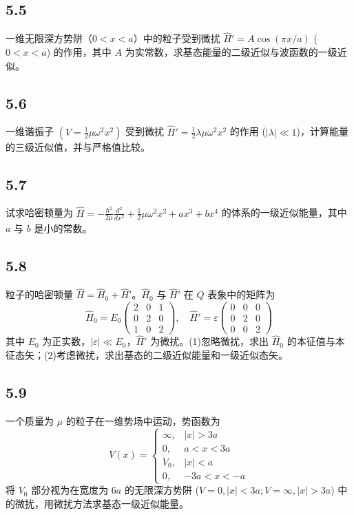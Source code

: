 \subsection{5.5}
一维无限深方势阱（$0 < x < a$）中的粒子受到微扰 $\hat{H}' = A \cos(\pi x / a)$ ($0 < x < a$) 的作用，其中 $A$ 为实常数，求基态能量的二级近似与波函数的一级近似。

\subsection{5.6}
一维谐振子 $\left( V = \frac{1}{2} \mu \omega^{2} x^{2} \right)$ 受到微扰 $\hat{H}' = \frac{1}{2} \lambda \mu \omega^{2} x^{2}$ 的作用 ($|\lambda| \ll 1$)，计算能量的三级近似值，并与严格值比较。

\subsection{5.7}
试求哈密顿量为 $\hat{H} = -\frac{\hbar^2}{2\mu} \frac{d^2}{dx^2} + \frac{1}{2} \mu \omega^2 x^2 + ax^3 + bx^4$ 的体系的一级近似能量，其中 $a$ 与 $b$ 是小的常数。

\subsection{5.8}
粒子的哈密顿量 $\hat{H} = \hat{H}_0 + \hat{H}'$。$\hat{H}_0$ 与 $\hat{H}'$ 在 $Q$ 表象中的矩阵为
$$\hat{H}_0 = E_0 \begin{pmatrix} 2 & 0 & 1 \\ 0 & 2 & 0 \\ 1 & 0 & 2 \end{pmatrix}, \quad \hat{H}' = \varepsilon \begin{pmatrix} 0 & 0 & 0 \\ 0 & 2 & 0 \\ 0 & 0 & 2 \end{pmatrix}$$
其中 $E_0$ 为正实数，$|\varepsilon| \ll E_0$，$\hat{H}'$ 为微扰。(1)忽略微扰，求出 $\hat{H}_0$ 的本征值与本征态矢；(2)考虑微扰，求出基态的二级近似能量和一级近似态矢。

\subsection{5.9}
一个质量为 $\mu$ 的粒子在一维势场中运动，势函数为
$$V(x) = \begin{cases} \infty, & |x| > 3a \\ 0, & a < x < 3a \\ V_0, & |x| < a \\ 0, & -3a < x < -a \end{cases}$$
将 $V_0$ 部分视为在宽度为 $6a$ 的无限深方势阱 ($V = 0, |x| < 3a; V = \infty, |x| > 3a$) 中的微扰，用微扰方法求基态一级近似能量。

